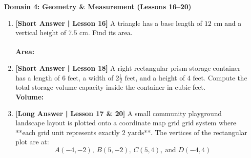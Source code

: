 \documentclass[12pt, letterpaper, fleqn]{article}
\newcommand{\blanklong}{\underline{\hspace{6.5cm}}}
\begin{document}
\vspace{0.5cm}

\begin{tcolorbox}[colback=white, colframe=black, arc=2mm]
    \textbf{Domain 4: Geometry \& Measurement (Lessons 16--20)}
\end{tcolorbox}

\begin{enumerate}[leftmargin=0.6cm, itemsep=1.2cm, start=13]

\item \textbf{[Short Answer | Lesson 16]} A triangle has a base length of $12\text{ cm}$ and a vertical height of $7.5\text{ cm}$. Find its area.
\\ \\
\textbf{Area:} \blanklong

\item \textbf{[Short Answer | Lesson 18]} A right rectangular prism storage container has a length of $6\text{ feet}$, a width of $2\frac{1}{2}\text{ feet}$, and a height of $4\text{ feet}$. Compute the total storage volume capacity inside the container in cubic feet.
\vspace{1.5cm} \\
\textbf{Volume:} \blanklong

\item \textbf{[Long Answer | Lesson 17 \& 20]} A small community playground landscape layout is plotted onto a coordinate map grid grid system where **each grid unit represents exactly $2\text{ yards}$**. The vertices of the rectangular plot are at:
$$A(-4, -2), \ B(5, -2), \ C(5, 4), \ \text{and } D(-4, 4)$$

\begin{center}
\end{center}


\end{enumerate}
\end{document}
